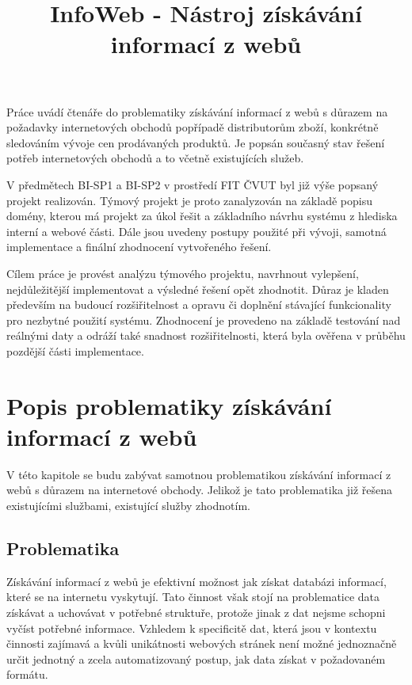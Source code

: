 \documentclass[thesis=B,czech]{FITthesis}[2012/06/26]
\title{ InfoWeb - Nástroj získávání informací z webů }
\begin{document}

\begin{introduction}
Práce uvádí čtenáře do problematiky získávání informací z webů s důrazem na požadavky internetových obchodů popřípadě distributorům zboží, 
konkrétně sledováním
vývoje cen prodávaných produktů. Je popsán současný stav řešení potřeb internetových obchodů a to včetně existujících služeb.
\par
V předmětech BI-SP1 a BI-SP2 v prostředí FIT ČVUT byl již výše popsaný projekt realizován.
Týmový projekt je proto zanalyzován na základě popisu domény, kterou má projekt za úkol řešit a základního návrhu systému
z hlediska interní a webové části. Dále jsou uvedeny postupy použité při vývoji, samotná implementace a finální zhodnocení vytvořeného řešení.
\par
Cílem práce je provést analýzu týmového projektu, navrhnout vylepšení, nejdůležitější implementovat a výsledné řešení opět zhodnotit. Důraz je kladen především na 
budoucí rozšiřitelnost a opravu či doplnění stávající funkcionality pro nezbytné použití systému. Zhodnocení je provedeno na základě
testování nad reálnými daty a odráží také snadnost rozšiřitelnosti, která byla ověřena v průběhu pozdější části implementace.
\par

\newpage

\end{introduction}


\chapter{Popis problematiky získávání informací z webů}

V této kapitole se budu zabývat samotnou problematikou získávání informací 
z webů s důrazem na internetové obchody.
Jelikož je tato problematika již řešena existujícími službami, existující služby zhodnotím.

\section{Problematika}
Získávání informací z webů je efektivní možnost jak získat databázi informací, které se na internetu vyskytují.
Tato činnost však stojí na problematice data získávat a uchovávat v potřebné struktuře, protože 
jinak z dat nejsme schopni vyčíst potřebné informace.
Vzhledem k specificitě dat, která jsou v kontextu činnosti zajímavá a kvůli unikátnosti webových stránek
není možné jednoznačně určit jednotný a zcela automatizovaný postup, jak data získat v požadovaném formátu.
\end{document}
